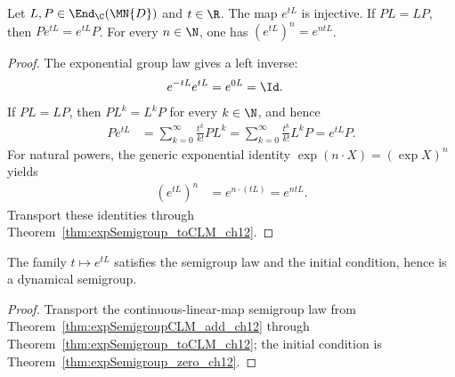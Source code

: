 \begin{theorem}
    \label{thm:semigroup_exp_algebra}
    \leanok
    Let $L,P\in\End_{\C}(\MN{D})$ and $t\in\R$.
    The map $e^{tL}$ is injective. If $PL=LP$, then $Pe^{tL}=e^{tL}P$.
    For every $n\in\N$, one has $(e^{tL})^n=e^{ntL}$.
\end{theorem}

\begin{proof}
    \leanok
    The exponential group law gives a left inverse:
    \begin{align}
        e^{-tL}e^{tL} &= e^{0L} = \Id.
        \label{eq:semigroup_exp_left_inverse}
    \end{align}
    If $PL=LP$, then $PL^k=L^kP$ for every $k\in\N$, and hence
    \begin{align}
        P e^{tL}
        &= \sum_{k=0}^{\infty}\frac{t^k}{k!}PL^k
        = \sum_{k=0}^{\infty}\frac{t^k}{k!}L^kP
        = e^{tL}P.
        \label{eq:semigroup_exp_commutation}
    \end{align}
    For natural powers, the generic exponential identity
    $\exp(n\cdot X)=(\exp X)^n$ yields
    \begin{align}
        (e^{tL})^n &= e^{n\cdot(tL)} = e^{ntL}.
        \label{eq:semigroup_exp_natural_power}
    \end{align}
    Transport these identities through
    Theorem~\ref{thm:expSemigroup_toCLM_ch12}.
\end{proof}

\begin{theorem}
    \label{thm:expSemigroup_isDynSemigroup_ch12}
    \leanok
    The family $t \mapsto e^{tL}$ satisfies the semigroup law and the initial
    condition, hence is a dynamical semigroup.
\end{theorem}

\begin{proof}
    \leanok
    Transport the continuous-linear-map semigroup law from
    Theorem~\ref{thm:expSemigroupCLM_add_ch12} through
    Theorem~\ref{thm:expSemigroup_toCLM_ch12}; the initial condition is
    Theorem~\ref{thm:expSemigroup_zero_ch12}.
\end{proof}

